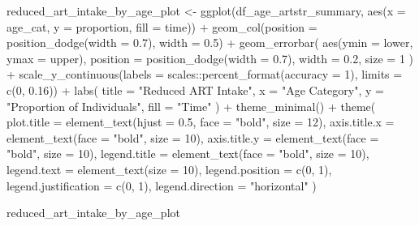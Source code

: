 \documentclass[
  letterpaper,
  DIV=11,
  numbers=noendperiod]{scrartcl}
\newenvironment{Shaded}{\begin{snugshade}}{\end{snugshade}}
\newcommand{\AttributeTok}[1]{\textcolor[rgb]{0.40,0.45,0.13}{#1}}
\newcommand{\DecValTok}[1]{\textcolor[rgb]{0.68,0.00,0.00}{#1}}
\newcommand{\FloatTok}[1]{\textcolor[rgb]{0.68,0.00,0.00}{#1}}
\newcommand{\FunctionTok}[1]{\textcolor[rgb]{0.28,0.35,0.67}{#1}}
\newcommand{\NormalTok}[1]{\textcolor[rgb]{0.00,0.23,0.31}{#1}}
\newcommand{\OtherTok}[1]{\textcolor[rgb]{0.00,0.23,0.31}{#1}}
\newcommand{\SpecialCharTok}[1]{\textcolor[rgb]{0.37,0.37,0.37}{#1}}
\newcommand{\StringTok}[1]{\textcolor[rgb]{0.13,0.47,0.30}{#1}}
\begin{document}
\begin{Shaded}
\begin{Highlighting}[]
\NormalTok{reduced\_art\_intake\_by\_age\_plot }\OtherTok{\textless{}{-}} \FunctionTok{ggplot}\NormalTok{(df\_age\_artstr\_summary, }\FunctionTok{aes}\NormalTok{(}\AttributeTok{x =}\NormalTok{ age\_cat, }\AttributeTok{y =}\NormalTok{ proportion, }\AttributeTok{fill =}\NormalTok{ time)) }\SpecialCharTok{+}
  \FunctionTok{geom\_col}\NormalTok{(}\AttributeTok{position =} \FunctionTok{position\_dodge}\NormalTok{(}\AttributeTok{width =} \FloatTok{0.7}\NormalTok{), }\AttributeTok{width =} \FloatTok{0.5}\NormalTok{) }\SpecialCharTok{+}
  \FunctionTok{geom\_errorbar}\NormalTok{(}
    \FunctionTok{aes}\NormalTok{(}\AttributeTok{ymin =}\NormalTok{ lower, }\AttributeTok{ymax =}\NormalTok{ upper),}
    \AttributeTok{position =} \FunctionTok{position\_dodge}\NormalTok{(}\AttributeTok{width =} \FloatTok{0.7}\NormalTok{),}
    \AttributeTok{width =} \FloatTok{0.2}\NormalTok{,}
    \AttributeTok{size =} \DecValTok{1}
\NormalTok{  ) }\SpecialCharTok{+}
  \FunctionTok{scale\_y\_continuous}\NormalTok{(}\AttributeTok{labels =}\NormalTok{ scales}\SpecialCharTok{::}\FunctionTok{percent\_format}\NormalTok{(}\AttributeTok{accuracy =} \DecValTok{1}\NormalTok{), }\AttributeTok{limits =} \FunctionTok{c}\NormalTok{(}\DecValTok{0}\NormalTok{, }\FloatTok{0.16}\NormalTok{)) }\SpecialCharTok{+}
  \FunctionTok{labs}\NormalTok{(}
    \AttributeTok{title =} \StringTok{"Reduced ART Intake"}\NormalTok{,}
    \AttributeTok{x =} \StringTok{"Age Category"}\NormalTok{,}
    \AttributeTok{y =} \StringTok{"Proportion of Individuals"}\NormalTok{,}
    \AttributeTok{fill =} \StringTok{"Time"}
\NormalTok{  ) }\SpecialCharTok{+}
  \FunctionTok{theme\_minimal}\NormalTok{() }\SpecialCharTok{+}
  \FunctionTok{theme}\NormalTok{(}
    \AttributeTok{plot.title =} \FunctionTok{element\_text}\NormalTok{(}\AttributeTok{hjust =} \FloatTok{0.5}\NormalTok{, }\AttributeTok{face =} \StringTok{"bold"}\NormalTok{, }\AttributeTok{size =} \DecValTok{12}\NormalTok{),}
    \AttributeTok{axis.title.x =} \FunctionTok{element\_text}\NormalTok{(}\AttributeTok{face =} \StringTok{"bold"}\NormalTok{, }\AttributeTok{size =} \DecValTok{10}\NormalTok{),}
    \AttributeTok{axis.title.y =} \FunctionTok{element\_text}\NormalTok{(}\AttributeTok{face =} \StringTok{"bold"}\NormalTok{, }\AttributeTok{size =} \DecValTok{10}\NormalTok{),}
    \AttributeTok{legend.title =} \FunctionTok{element\_text}\NormalTok{(}\AttributeTok{face =} \StringTok{"bold"}\NormalTok{, }\AttributeTok{size =} \DecValTok{10}\NormalTok{),}
    \AttributeTok{legend.text =} \FunctionTok{element\_text}\NormalTok{(}\AttributeTok{size =} \DecValTok{10}\NormalTok{),}
    \AttributeTok{legend.position =} \FunctionTok{c}\NormalTok{(}\DecValTok{0}\NormalTok{, }\DecValTok{1}\NormalTok{),}
    \AttributeTok{legend.justification =} \FunctionTok{c}\NormalTok{(}\DecValTok{0}\NormalTok{, }\DecValTok{1}\NormalTok{),}
    \AttributeTok{legend.direction =} \StringTok{"horizontal"}
\NormalTok{  )}

\NormalTok{reduced\_art\_intake\_by\_age\_plot}
\end{Highlighting}
\end{Shaded}
\end{document}
